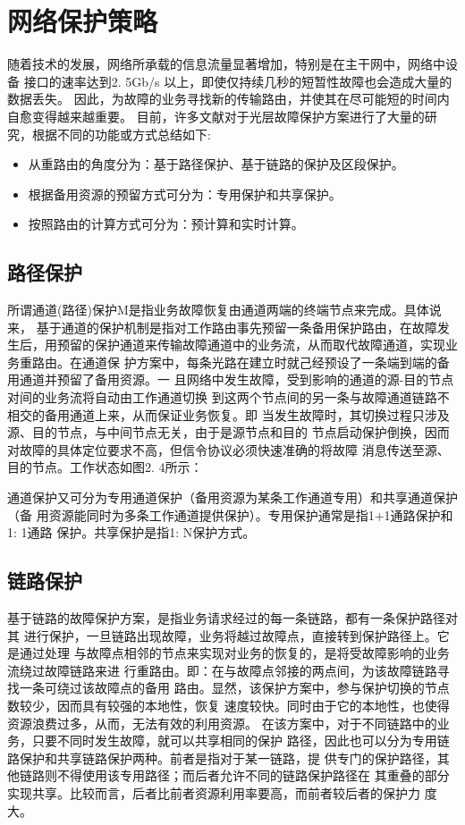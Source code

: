 \section{网络保护策略}
随着技术的发展，网络所承载的信息流量显著增加，特别是在主干网中，网络中设备 接口的速率达到2. 5Gb/s 以上，即使仅持续几秒的短暂性故障也会造成大量的数据丢失。 因此，为故障的业务寻找新的传输路由，并使其在尽可能短的时间内自愈变得越来越重要。 目前，许多文献对于光层故障保护方案进行了大量的研究，根据不同的功能或方式总结如下:
\begin{itemize}
  \item 从重路由的角度分为：基于路径保护、基于链路的保护及区段保护。
  \item 根据备用资源的预留方式可分为：专用保护和共享保护。
  \item 按照路由的计算方式可分为：预计算和实时计算。
\end{itemize}
\subsection{路径保护}
所谓通道(路径)保护M是指业务故障恢复由通道两端的终端节点来完成。具体说来， 基于通道的保护机制是指对工作路由事先预留一条备用保护路由，在故障发生后，用预留的保护通道来传输故障通道中的业务流，从而取代故障通道，实现业务重路由。在通道保 护方案中，每条光路在建立时就己经预设了一条端到端的备用通道并预留了备用资源。一 且网络中发生故障，受到影响的通道的源-目的节点对间的业务流将自动由工作通道切换 到这两个节点间的另一条与故障通道链路不相交的备用通道上来，从而保证业务恢复。即 当发生故障时，其切换过程只涉及源、目的节点，与中间节点无关，由于是源节点和目的 节点启动保护倒换，因而对故障的具体定位要求不高，但信令协议必须快速准确的将故障 消息传送至源、目的节点。工作状态如图2. 4所示：

通道保护又可分为专用通道保护（备用资源为某条工作通道专用）和共享通道保护（备 用资源能同时为多条工作通道提供保护）。专用保护通常是指1+1通路保护和1: 1通路 保护。共享保护是指1: N保护方式。
\subsection{链路保护}
基于链路的故障保护方案，是指业务请求经过的每一条链路，都有一条保护路径对其 进行保护，一旦链路出现故障，业务将越过故障点，直接转到保护路径上。它是通过处理 与故障点相邻的节点来实现对业务的恢复的，是将受故障影响的业务流绕过故障链路来进 行重路由。即：在与故障点邻接的两点间，为该故障链路寻找一条可绕过该故障点的备用 路由。显然，该保护方案中，参与保护切换的节点数较少，因而具有较强的本地性，恢复 速度较快。同时由于它的本地性，也使得资源浪费过多，从而，无法有效的利用资源。
在该方案中，对于不同链路中的业务，只要不同时发生故障，就可以共享相同的保护 路径，因此也可以分为专用链路保护和共享链路保护两种。前者是指对于某一链路，提 供专门的保护路径，其他链路则不得使用该专用路径；而后者允许不同的链路保护路径在 其重叠的部分实现共享。比较而言，后者比前者资源利用率要高，而前者较后者的保护力 度大。
